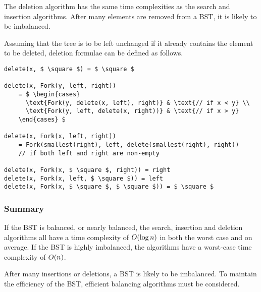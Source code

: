 The deletion algorithm has the same time complexities as the search and insertion algorithms.
After many elements are removed from a BST, it is likely to be imbalanced.

Assuming that the tree is to be left unchanged if it already contains the element to be deleted, deletion formulae can be defined as follows.
\begin{lstlisting}[mathescape=true]
delete(x, $ \square $) = $ \square $

delete(x, Fork(y, left, right))
    = $ \begin{cases}
      \text{Fork(y, delete(x, left), right)} & \text{// if x < y} \\
      \text{Fork(y, left, delete(x, right))} & \text{// if x > y}
    \end{cases} $

delete(x, Fork(x, left, right))
    = Fork(smallest(right), left, delete(smallest(right), right))
    // if both left and right are non-empty

delete(x, Fork(x, $ \square $, right)) = right
delete(x, Fork(x, left, $ \square $)) = left
delete(x, Fork(x, $ \square $, $ \square $)) = $ \square $
\end{lstlisting}

\subsubsection{Summary}

If the BST is balanced, or nearly balanced, the search, insertion and deletion algorithms all have a time complexity of \( O\!\left(\log n\right) \) in both the worst case and on average.
If the BST is highly imbalanced, the algorithms have a worst-case time complexity of \( O\!\left(n\right) \).

After many insertions or deletions, a BST is likely to be imbalanced.
To maintain the efficiency of the BST, efficient balancing algorithms must be considered.
